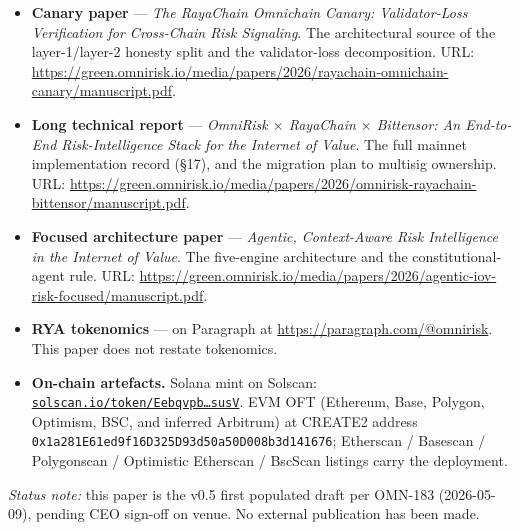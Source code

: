 \documentclass[11pt,a4paper]{article}
\begin{document}
\begingroup
\sloppy
{}
\begin{itemize}
  \item \textbf{Canary paper} --- \emph{The RayaChain Omnichain
    Canary: Validator-Loss Verification for Cross-Chain Risk
    Signaling}. The architectural source of the layer-1/layer-2
    honesty split and the validator-loss decomposition. URL:
    \url{https://green.omnirisk.io/media/papers/2026/rayachain-omnichain-canary/manuscript.pdf}.
  \item \textbf{Long technical report} --- \emph{OmniRisk $\times$
    RayaChain $\times$ Bittensor: An End-to-End Risk-Intelligence
    Stack for the Internet of Value}. The full mainnet implementation
    record (\S17), and the migration plan to multisig ownership.
    URL:
    \url{https://green.omnirisk.io/media/papers/2026/omnirisk-rayachain-bittensor/manuscript.pdf}.
  \item \textbf{Focused architecture paper} --- \emph{Agentic,
    Context-Aware Risk Intelligence in the Internet of Value}. The
    five-engine architecture and the constitutional-agent rule.
    URL:
    \url{https://green.omnirisk.io/media/papers/2026/agentic-iov-risk-focused/manuscript.pdf}.
  \item \textbf{RYA tokenomics} --- on Paragraph at
    \url{https://paragraph.com/@omnirisk}. This paper does not
    restate tokenomics.
  \item \textbf{On-chain artefacts.} Solana mint on Solscan:%
    \\[0.15em]
    \href{https://solscan.io/token/EebqvpbYoJYQLzeUfjVoHWopogSE6ECRX5HJmBr6susV}%
         {\texttt{solscan.io/token/Eebqvpb\dots susV}}.
    EVM OFT (Ethereum, Base, Polygon, Optimism, BSC, and inferred
    Arbitrum) at CREATE2 address
    \mbox{\texttt{0x1a281E61ed9f16D325D93d50a50D008b3d141676}};
    Etherscan / Basescan / Polygonscan / Optimistic Etherscan /
    BscScan listings carry the deployment.
\end{itemize}
\endgroup

\noindent\textit{Status note:} this paper is the v0.5 first populated
draft per OMN-183 (2026-05-09), pending CEO sign-off on venue. No
external publication has been made.
\end{document}

